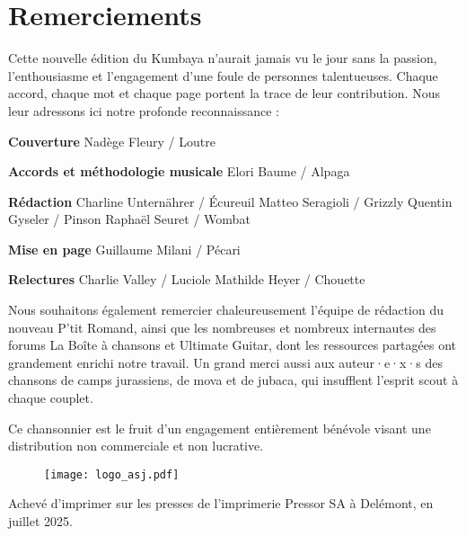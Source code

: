 \section*{Remerciements}
Cette nouvelle édition du Kumbaya n'aurait jamais vu le jour sans la passion, l'enthousiasme et l'engagement d'une foule de personnes talentueuses. Chaque accord, chaque mot et chaque page portent la trace de leur contribution. Nous leur adressons ici notre profonde reconnaissance :

\begin{flushleft}
    \textbf{Couverture} \linebreak
    Nadège Fleury / Loutre

    \textbf{Accords et méthodologie musicale} \linebreak
    Elori Baume / Alpaga

    \textbf{Rédaction} \linebreak
    Charline Unternährer / Écureuil \linebreak
    Matteo Seragioli / Grizzly \linebreak
    Quentin Gyseler / Pinson \linebreak
    Raphaël Seuret / Wombat

    \textbf{Mise en page} \linebreak
    Guillaume Milani / Pécari

    \textbf{Relectures} \linebreak
    Charlie Valley / Luciole\linebreak
    Mathilde Heyer / Chouette
\end{flushleft}

Nous souhaitons également remercier chaleureusement l'équipe de rédaction du nouveau P'tit Romand, ainsi que les nombreuses et nombreux internautes des forums La Boîte à chansons et Ultimate Guitar, dont les ressources partagées ont grandement enrichi notre travail. Un grand merci aussi aux auteur·e·x·s des chansons de camps jurassiens, de mova et de jubaca, qui insufflent l'esprit scout à chaque couplet.

Ce chansonnier est le fruit d'un engagement entièrement bénévole visant une distribution non commerciale et non lucrative.

\begin{figure}[h]
    \vspace{4pt}
    \texttt{[image: logo\_asj.pdf]}
    \centering
    \vspace{4pt}
\end{figure}

Achevé d'imprimer sur les presses de l'imprimerie Pressor SA à Delémont, en juillet 2025.
